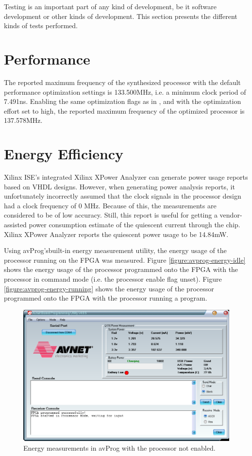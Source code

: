 Testing is an important part of any kind of development, be it software development or other kinds of development.
This section presents the different kinds of tests performed.

\section{Performance}

The reported maximum frequency of the synthesized processor with the default performance optimization settings is 133.500MHz, i.e. a minimum clock period of 7.491ns.
Enabling the same optimization flags as in \cite{assignment-1}, and with the optimization effort set to high, the reported maximum frequency of the optimized processor is 137.578MHz.

\section{Energy Efficiency}
\label{results:energy-efficiency}

Xilinx ISE's integrated Xilinx XPower Analyzer can generate power usage reports based on VHDL designs.
However, when generating power analysis reports, it unfortunately incorrectly assumed that the clock signals in the processor design had a clock frequency of 0 MHz.
Because of this, the measurements are considered to be of low accuracy.
Still, this report is useful for getting a vendor-assisted power consumption estimate of the quiescent current through the chip.
Xilinx XPower Analyzer reports the quiescent power usage to be 14.84mW.

Using avProg's\cn built-in energy measurement utility, the energy usage of the processor running on the FPGA was measured.
Figure \vref{figure:avprog-energy-idle} shows the energy usage of the processor programmed onto the FPGA with the processor in command mode (i.e. the processor enable flag unset).
Figure \vref{figure:avprog-energy-running} shows the energy usage of the processor programmed onto the FPGA with the processor running a program.

\begin{figure}[H]
\includegraphics[width=\textwidth]{illustrations/paused.PNG}
\caption{Energy measurements in avProg with the processor not enabled.}
\label{figure-avprog-energy-idle}
\end{figure}

